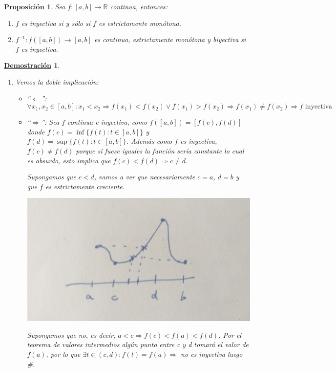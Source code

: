 \documentclass[10pt,a4paper,openright]{book}
\theoremstyle{break}
\newtheorem{prop}{Proposición}[chapter]
\newtheorem*{demo}{\underline{Demostración}}
\begin{document}
\begin{prop}
Sea $f:[a,b]\rightarrow \mathbb R$ continua, entonces:
\begin{enumerate}
\item $f$ es inyectiva si y sólo si $f$ es estrictamente monótona.
\item $f^{-1}: f([a,b])\rightarrow [a,b]$ es continua, estrictamente monótona y biyectiva si $f$ es inyectiva.
\end{enumerate}
\end{prop}
\begin{demo}
\begin{enumerate}
\item Vemos la doble implicación:
	\begin{itemize}
	\item ``$\Leftarrow$'':
	$$\forall x_1, x_2\in [a,b]: x_1<x_2\Rightarrow f(x_1)<f(x_2) \vee f(x_1)>f(x_2)\Rightarrow f(x_1)\neq f(x_2) \Rightarrow f\mbox{ inyectiva}$$
	
	\item ``$\Rightarrow$'':
	Sea $f$ continua e inyectiva, como $f([a,b])=[f(c), f(d)]$ donde $f(c)=\inf\{f(t): t\in [a,b]\}$ y $f(d)=\sup\{f(t): t\in [a,b]\}$. Además como $f$ es inyectiva, $f(c)\neq f(d)$ porque si fuese iguales la función sería constante lo cual es absurdo, esto implica que $f(c)<f(d)\Rightarrow c\neq d$.
	
	Supongamos que $c<d$, vamos a ver que necesariamente $c=a$, $d=b$ y que $f$ es estrictamente creciente.
	\begin{center}
	\includegraphics[scale=0.20]{inyectivas continuas son monotonas}
	\end{center}
	Supongamos que no, es decir, $a<c\Rightarrow f(c)< f(a)< f(d)$. Por el teorema de valores intermedios algún punto entre c y d tomará el valor de $f(a)$, por lo que $\exists t\in (c,d): f(t)=f(a)\Rightarrow $ no es inyectiva luego \#.
	

\end{itemize}
\end{enumerate}
\end{demo}
\end{document}
